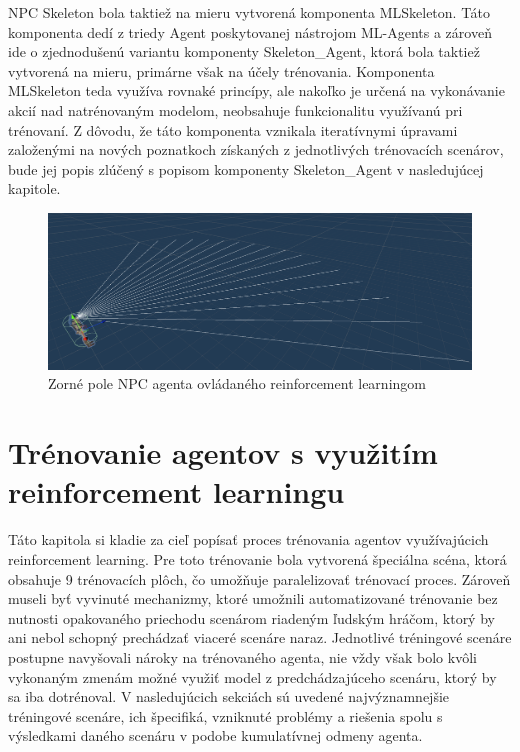\documentclass[slovak, master]{diploma}
\begin{document}
NPC Skeleton bola taktiež na mieru vytvorená komponenta MLSkeleton. Táto komponenta dedí z triedy Agent poskytovanej nástrojom ML-Agents a zároveň ide o zjednodušenú variantu komponenty Skeleton\_Agent, ktorá bola taktiež vytvorená na mieru, primárne však na účely trénovania. Komponenta MLSkeleton teda využíva rovnaké princípy, ale nakoľko je určená na vykonávanie akcií nad natrénovaným modelom, neobsahuje funkcionalitu využívanú pri trénovaní. Z dôvodu, že táto komponenta vznikala iteratívnymi úpravami založenými na nových poznatkoch získaných z jednotlivých trénovacích scenárov, bude jej popis zlúčený s popisom komponenty Skeleton\_Agent v nasledujúcej kapitole.

\begin{figure}[!htbp]
    \centering
    \includegraphics[width=1\textwidth]{Figures/rayperceptron.png}
    \caption{Zorné pole NPC agenta ovládaného reinforcement learningom}
    \label{pic:rayPercept}
\end{figure}

\chapter{Trénovanie agentov s využitím reinforcement learningu}
\label{sec:Training}
Táto kapitola si kladie za cieľ popísať proces trénovania agentov využívajúcich reinforcement learning. Pre toto trénovanie bola vytvorená špeciálna scéna, ktorá obsahuje 9 trénovacích plôch, čo umožňuje paralelizovať trénovací proces. Zároveň museli byť vyvinuté mechanizmy, ktoré umožnili automatizované trénovanie bez nutnosti opakovaného priechodu scenárom riadeným ľudským hráčom, ktorý by ani nebol schopný prechádzať viaceré scenáre naraz. Jednotlivé tréningové scenáre postupne navyšovali nároky na trénovaného agenta, nie vždy však bolo kvôli vykonaným zmenám možné využiť model z predchádzajúceho scenáru, ktorý by sa iba dotrénoval. V nasledujúcich sekciách sú uvedené najvýznamnejšie tréningové scenáre, ich špecifiká, vzniknuté problémy a riešenia spolu s výsledkami daného scenáru v podobe kumulatívnej odmeny agenta.
\end{document}
